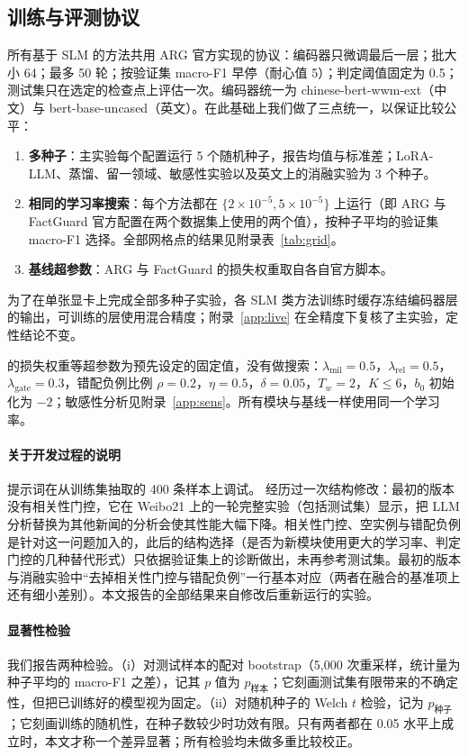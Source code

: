 \subsection{训练与评测协议}\label{sec:protocol}

所有基于 SLM 的方法共用 ARG 官方实现的协议：编码器只微调最后一层；批大小 64；最多 50 轮；按验证集 macro-F1 早停（耐心值 5）；判定阈值固定为 0.5；测试集只在选定的检查点上评估一次。编码器统一为 chinese-bert-wwm-ext\citep{cui2021wwm}（中文）与 bert-base-uncased（英文）。在此基础上我们做了三点统一，以保证比较公平：
\begin{enumerate}
\item \textbf{多种子}：主实验每个配置运行 5 个随机种子，报告均值与标准差；LoRA-LLM、蒸馏、留一领域、敏感性实验以及英文上的消融实验为 3 个种子。
\item \textbf{相同的学习率搜索}：每个方法都在 $\{2\times10^{-5},5\times10^{-5}\}$ 上运行（即 ARG 与 FactGuard 官方配置在两个数据集上使用的两个值），按种子平均的验证集 macro-F1 选择。全部网格点的结果见附录表~\ref{tab:grid}。
\item \textbf{基线超参数}：ARG 与 FactGuard 的损失权重取自各自官方脚本。
\end{enumerate}

为了在单张显卡上完成全部多种子实验，各 SLM 类方法训练时缓存冻结编码器层的输出，可训练的层使用混合精度；附录~\ref{app:live} 在全精度下复核了主实验，定性结论不变。

\method{} 的损失权重等超参数为预先设定的固定值，没有做搜索：$\lambda_{\mathrm{mil}}{=}0.5$，$\lambda_{\mathrm{rel}}{=}0.5$，$\lambda_{\mathrm{gate}}{=}0.3$，错配负例比例 $\rho{=}0.2$，$\eta{=}0.5$，$\delta{=}0.05$，$T_w{=}2$，$K\le6$，$b_0$ 初始化为 $-2$；敏感性分析见附录~\ref{app:sens}。所有模块与基线一样使用同一个学习率。

\paragraph{关于开发过程的说明}
提示词在从训练集抽取的 400 条样本上调试。\method{} 经历过一次结构修改：最初的版本没有相关性门控，它在 Weibo21 上的一轮完整实验（包括测试集）显示，把 LLM 分析替换为其他新闻的分析会使其性能大幅下降。相关性门控、空实例与错配负例是针对这一问题加入的，此后的结构选择（是否为新模块使用更大的学习率、判定门控的几种替代形式）只依据验证集上的诊断做出，未再参考测试集。最初的版本与消融实验中“去掉相关性门控与错配负例”一行基本对应（两者在融合的基准项上还有细小差别）。本文报告的全部结果来自修改后重新运行的实验。

\paragraph{显著性检验}
我们报告两种检验。（i）对测试样本的配对 bootstrap\citep{koehn2004statistical}（5{,}000 次重采样，统计量为种子平均的 macro-F1 之差），记其 $p$ 值为 $p_{\text{样本}}$；它刻画测试集有限带来的不确定性，但把已训练好的模型视为固定。（ii）对随机种子的 Welch $t$ 检验，记为 $p_{\text{种子}}$；它刻画训练的随机性，在种子数较少时功效有限。只有两者都在 0.05 水平上成立时，本文才称一个差异显著；所有检验均未做多重比较校正。

